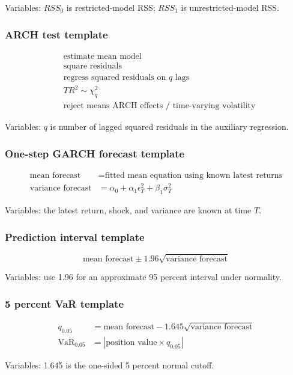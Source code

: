\documentclass[
  8pt,
  twocolumn]{extarticle}
\begin{document}
Variables: \(RSS_0\) is restricted-model RSS; \(RSS_1\) is
unrestricted-model RSS.

\subsubsection{ARCH test template}\label{arch-test-template}

\[
\begin{aligned}
&\text{estimate mean model}\\
&\text{square residuals}\\
&\text{regress squared residuals on }q\text{ lags}\\
&TR^2\sim\chi_q^2\\
&\text{reject means ARCH effects / time-varying volatility}
\end{aligned}
\]

Variables: \(q\) is number of lagged squared residuals in the auxiliary
regression.

\subsubsection{One-step GARCH forecast
template}\label{one-step-garch-forecast-template}

\[
\begin{aligned}
\text{mean forecast}&=\text{fitted mean equation using known latest returns}\\
\text{variance forecast}&=\alpha_0+\alpha_1\epsilon_T^2+\beta_1\sigma_T^2
\end{aligned}
\]

Variables: the latest return, shock, and variance are known at time
\(T\).

\subsubsection{Prediction interval
template}\label{prediction-interval-template}

\[
\text{mean forecast}\pm1.96\sqrt{\text{variance forecast}}
\]

Variables: use 1.96 for an approximate 95 percent interval under
normality.

\subsubsection{5 percent VaR template}\label{percent-var-template}

\[
\begin{aligned}
q_{0.05}&=\text{mean forecast}-1.645\sqrt{\text{variance forecast}}\\
\operatorname{VaR}_{0.05}&=|\text{position value}\times q_{0.05}|
\end{aligned}
\]

Variables: 1.645 is the one-sided 5 percent normal cutoff.
\end{document}
